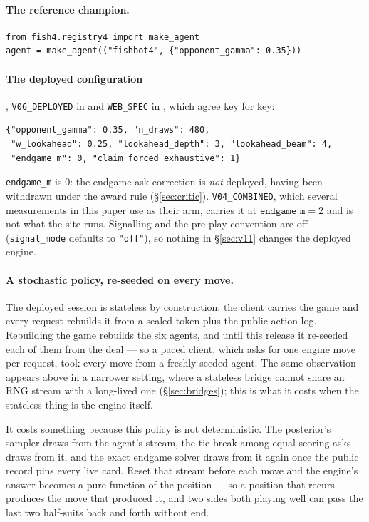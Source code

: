 \documentclass[11pt,letterpaper]{article}
\begin{document}
\paragraph{The reference champion.}
\begin{verbatim}
from fish4.registry4 import make_agent
agent = make_agent(("fishbot4", {"opponent_gamma": 0.35}))
\end{verbatim}

\paragraph{The deployed configuration}, \texttt{V06\_DEPLOYED} in
 and \texttt{WEB\_SPEC} in ,
which agree key for key:
\begin{verbatim}
{"opponent_gamma": 0.35, "n_draws": 480,
 "w_lookahead": 0.25, "lookahead_depth": 3, "lookahead_beam": 4,
 "endgame_m": 0, "claim_forced_exhaustive": 1}
\end{verbatim}
\noindent \texttt{endgame\_m} is $0$: the endgame ask correction is
\emph{not} deployed, having been withdrawn under the award rule
(\S\ref{sec:critic}). \texttt{V04\_COMBINED}, which several measurements in
this paper use as their arm, carries it at $\texttt{endgame\_m} = 2$ and is
not what the site runs. Signalling and the pre-play convention are off
(\texttt{signal\_mode} defaults to \texttt{"off"}), so nothing in
\S\ref{sec:v11} changes the deployed engine.

\paragraph{A stochastic policy, re-seeded on every move.} The deployed session
is stateless by construction: the client carries the game and every request
rebuilds it from a sealed token plus the public action log. Rebuilding the game
rebuilds the six agents, and until this release it re-seeded each of them from
the deal --- so a paced client, which asks for one engine move per request, took
every move from a freshly seeded agent. The same observation appears above in a
narrower setting, where a stateless bridge cannot share an RNG stream with a
long-lived one (\S\ref{sec:bridges}); this is what it costs when the stateless
thing is the engine itself.

It costs something because this policy is not deterministic. The posterior's
sampler draws from the agent's stream, the tie-break among equal-scoring asks
draws from it, and the exact endgame solver draws from it again once the public
record pins every live card. Reset that stream before each move and the
engine's answer becomes a pure function of the position --- so a position that
recurs produces the move that produced it, and two sides both playing well can
pass the last two half-suits back and forth without end.
\end{document}
